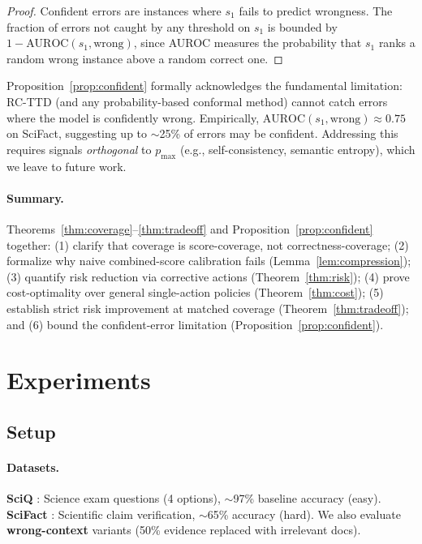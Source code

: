 \documentclass[letterpaper]{article}
\begin{document}
\begin{proof}
Confident errors are instances where $s_1$ fails to predict wrongness. The fraction of errors not caught by any threshold on $s_1$ is bounded by $1 - \text{AUROC}(s_1, \text{wrong})$, since AUROC measures the probability that $s_1$ ranks a random wrong instance above a random correct one.
\end{proof}

Proposition~\ref{prop:confident} formally acknowledges the fundamental limitation: RC-TTD (and any probability-based conformal method) cannot catch errors where the model is confidently wrong. Empirically, $\text{AUROC}(s_1, \text{wrong}) \approx 0.75$ on SciFact, suggesting up to $\sim$25\% of errors may be confident. Addressing this requires signals \emph{orthogonal} to $p_{\max}$ (e.g., self-consistency, semantic entropy), which we leave to future work.

\paragraph{Summary.}
Theorems~\ref{thm:coverage}--\ref{thm:tradeoff} and Proposition~\ref{prop:confident} together: (1) clarify that coverage is score-coverage, not correctness-coverage; (2) formalize why naive combined-score calibration fails (Lemma~\ref{lem:compression}); (3) quantify risk reduction via corrective actions (Theorem~\ref{thm:risk}); (4) prove cost-optimality over general single-action policies (Theorem~\ref{thm:cost}); (5) establish strict risk improvement at matched coverage (Theorem~\ref{thm:tradeoff}); and (6) bound the confident-error limitation (Proposition~\ref{prop:confident}).

\section{Experiments}

\subsection{Setup}

\paragraph{Datasets.}
\textbf{SciQ} \cite{welbl2017sciq}: Science exam questions (4 options), $\sim$97\% baseline accuracy (easy). \textbf{SciFact} \cite{wadden2020scifact}: Scientific claim verification, $\sim$65\% accuracy (hard). We also evaluate \textbf{wrong-context} variants (50\% evidence replaced with irrelevant docs).
\end{document}
